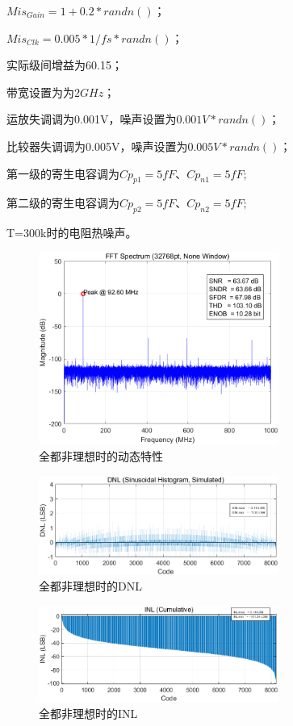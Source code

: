 \documentclass[cs4size,a4paper]{ctexart}
\numberwithin{equation}{section}
\numberwithin{table}{section}
\numberwithin{figure}{section}
\begin{document}
$Mis_{Gain} = 1 + 0.2 * randn()$；

$Mis_{Clk} = 0.005 * 1/fs * randn()$；

实际级间增益为60.15；

带宽设置为为$2GHz$；

运放失调调为0.001V，噪声设置为$0.001V*randn()$；

比较器失调调为0.005V，噪声设置为$0.005V*randn()$；

第一级的寄生电容调为$Cp_{p1}  = 5fF $、$ Cp_{n1} = 5fF;$ 

第二级的寄生电容调为$Cp_{p2}  = 5fF $、$ Cp_{n2} = 5fF;$ 

T=300k时的电阻热噪声。
		\begin{figure}[H]
			\centering
			\includegraphics[width=0.7\textwidth]{pic/noideal/DFT.png}
			\caption{全都非理想时的动态特性} 
		\end{figure}

		\begin{figure}[H]
			\centering
			\includegraphics[width=0.7\textwidth]{pic/noideal/DNL.png}
			\caption{全都非理想时的DNL} 
		\end{figure}

		\begin{figure}[H]
			\centering
			\includegraphics[width=0.7\textwidth]{pic/noideal/INL.png}
			\caption{全都非理想时的INL} 
		\end{figure}


% 
\clearpage
% 
%
\end{document}
